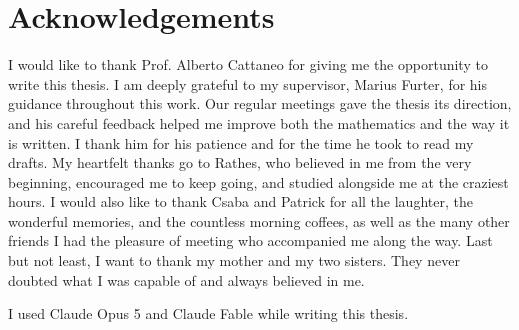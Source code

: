 \chapter*{Acknowledgements}
I would like to thank Prof. Alberto Cattaneo for giving me the opportunity to write this thesis. I am deeply grateful to my supervisor, Marius Furter, for his guidance throughout this work. Our regular meetings gave the thesis its direction, and his careful feedback helped me improve both the mathematics and the way it is written. I thank him for his patience and for the time he took to read my drafts.
My heartfelt thanks go to Rathes, who believed in me from the very beginning, encouraged me to keep going, and studied alongside me at the craziest hours. I would also like to thank Csaba and Patrick for all the laughter, the wonderful memories, and the countless morning coffees, as well as the many other friends I had the pleasure of meeting who accompanied me along the way. Last but not least, I want to thank my mother and my two sisters. They never doubted what I was capable of and always believed in me.

I used Claude Opus 5 and Claude Fable while writing this thesis.